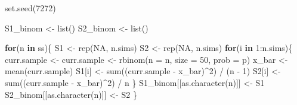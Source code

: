 \documentclass[
]{article}
\newenvironment{Shaded}{\begin{snugshade}}{\end{snugshade}}
\newcommand{\AttributeTok}[1]{\textcolor[rgb]{0.40,0.45,0.13}{#1}}
\newcommand{\ConstantTok}[1]{\textcolor[rgb]{0.56,0.35,0.01}{#1}}
\newcommand{\ControlFlowTok}[1]{\textcolor[rgb]{0.00,0.23,0.31}{\textbf{#1}}}
\newcommand{\DecValTok}[1]{\textcolor[rgb]{0.68,0.00,0.00}{#1}}
\newcommand{\FunctionTok}[1]{\textcolor[rgb]{0.28,0.35,0.67}{#1}}
\newcommand{\NormalTok}[1]{\textcolor[rgb]{0.00,0.23,0.31}{#1}}
\newcommand{\OtherTok}[1]{\textcolor[rgb]{0.00,0.23,0.31}{#1}}
\newcommand{\SpecialCharTok}[1]{\textcolor[rgb]{0.37,0.37,0.37}{#1}}
\begin{document}
\begin{Shaded}
\begin{Highlighting}[numbers=left,,]
\FunctionTok{set.seed}\NormalTok{(}\DecValTok{7272}\NormalTok{)}

\NormalTok{S1\_binom }\OtherTok{\textless{}{-}} \FunctionTok{list}\NormalTok{()}
\NormalTok{S2\_binom }\OtherTok{\textless{}{-}} \FunctionTok{list}\NormalTok{()}

\ControlFlowTok{for}\NormalTok{(n }\ControlFlowTok{in}\NormalTok{ ss)\{}
\NormalTok{  S1 }\OtherTok{\textless{}{-}} \FunctionTok{rep}\NormalTok{(}\ConstantTok{NA}\NormalTok{, n.sims)}
\NormalTok{  S2 }\OtherTok{\textless{}{-}} \FunctionTok{rep}\NormalTok{(}\ConstantTok{NA}\NormalTok{, n.sims)}
  \ControlFlowTok{for}\NormalTok{(i }\ControlFlowTok{in} \DecValTok{1}\SpecialCharTok{:}\NormalTok{n.sims)\{}
\NormalTok{    curr.sample }\OtherTok{\textless{}{-}}\NormalTok{ curr.sample }\OtherTok{\textless{}{-}} \FunctionTok{rbinom}\NormalTok{(}\AttributeTok{n =}\NormalTok{ n, }\AttributeTok{size =} \DecValTok{50}\NormalTok{, }\AttributeTok{prob =}\NormalTok{ p)}
\NormalTok{    x\_bar }\OtherTok{\textless{}{-}} \FunctionTok{mean}\NormalTok{(curr.sample)}
\NormalTok{    S1[i] }\OtherTok{\textless{}{-}} \FunctionTok{sum}\NormalTok{((curr.sample }\SpecialCharTok{{-}}\NormalTok{ x\_bar)}\SpecialCharTok{\^{}}\DecValTok{2}\NormalTok{) }\SpecialCharTok{/}\NormalTok{ (n }\SpecialCharTok{{-}} \DecValTok{1}\NormalTok{)}
\NormalTok{    S2[i] }\OtherTok{\textless{}{-}} \FunctionTok{sum}\NormalTok{((curr.sample }\SpecialCharTok{{-}}\NormalTok{ x\_bar)}\SpecialCharTok{\^{}}\DecValTok{2}\NormalTok{) }\SpecialCharTok{/}\NormalTok{ n}
\NormalTok{  \}}
\NormalTok{  S1\_binom[[}\FunctionTok{as.character}\NormalTok{(n)]] }\OtherTok{\textless{}{-}}\NormalTok{ S1}
\NormalTok{  S2\_binom[[}\FunctionTok{as.character}\NormalTok{(n)]] }\OtherTok{\textless{}{-}}\NormalTok{ S2}
\NormalTok{\}}


\end{Highlighting}
\end{Shaded}
\end{document}

